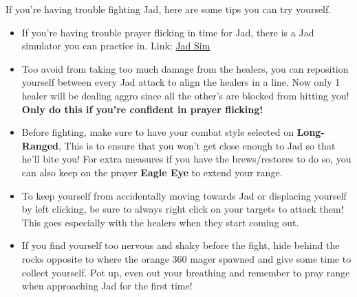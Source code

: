 \documentclass{article}
\begin{document}
If you're having trouble fighting Jad, here are some tips you can try yourself.
\begin{itemize}
    \item If you're having trouble prayer flicking in time for Jad, there is a Jad simulator you can practice in. Link: \href{https://runeapps.org/jadsim_app}{Jad Sim}
    \item Too avoid from taking too much damage from the healers, you can reposition yourself between every Jad attack to align the healers in a line. Now only 1 healer will be dealing aggro since all the other's are blocked from hitting you! \textbf{Only do this if you're confident in prayer flicking!}
    \item Before fighting, make sure to have your combat style selected on \textbf{Long-Ranged}, This is to ensure that you won't get close enough to Jad so that he'll bite you! For extra measures if you have the brews/restores to do so, you can also keep on the prayer \textbf{Eagle Eye} to extend your range. 
    \item To keep yourself from accidentally moving towards Jad or displacing yourself by left clicking, be sure to always right click on your targets to attack them! This goes especially with the healers when they start coming out.
    \item If you find yourself too nervous and shaky before the fight, hide behind the rocks opposite to where the orange 360 mager spawned and give some time to collect yourself. Pot up, even out your breathing and remember to pray range when approaching Jad for the first time!
    \end{itemize}
\newpage
\end{document}
